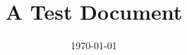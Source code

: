 \documentclass{article}%
\title{A Test Document}%
\date{\today}%
\begin{document}
%
\normalsize%
\maketitle%
\end{document}
